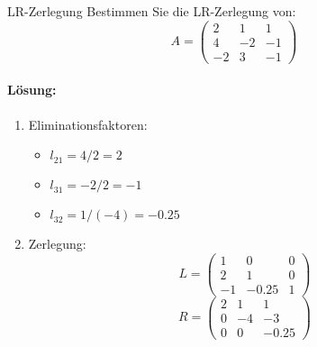 \begin{example2}{LR-Zerlegung}
Bestimmen Sie die LR-Zerlegung von:
$$A = \begin{pmatrix}
2 & 1 & 1 \\
4 & -2 & -1 \\
-2 & 3 & -1
\end{pmatrix}$$

\paragraph{Lösung:}
\begin{enumerate}
    \item Eliminationsfaktoren:
    \begin{itemize}
        \item $l_{21} = 4/2 = 2$
        \item $l_{31} = -2/2 = -1$
        \item $l_{32} = 1/(-4) = -0.25$
    \end{itemize}
    
    \item Zerlegung:
    $$L = \begin{pmatrix}
    1 & 0 & 0 \\
    2 & 1 & 0 \\
    -1 & -0.25 & 1
    \end{pmatrix}$$
    $$R = \begin{pmatrix}
    2 & 1 & 1 \\
    0 & -4 & -3 \\
    0 & 0 & -0.25
    \end{pmatrix}$$
\end{enumerate}
\end{example2}

